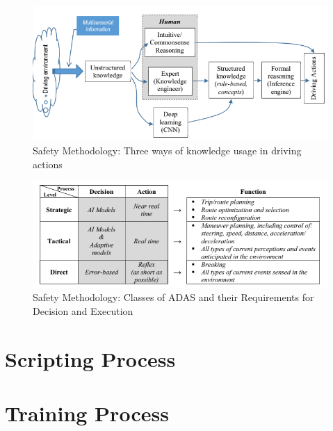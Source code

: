 \documentclass[12pt]{report} %
\begin{document}
		\begin{figure}[ht]
			\centering
			\includegraphics[width=.60\columnwidth]{Figures/literature_review/proposal/SystemFunctionality-2.png}
			\caption{Safety Methodology: Three ways of knowledge usage in driving actions~\cite{ionita_autonomous_2017}}
			\label{fig:avmOperationalMethodology-SF2}
		\end{figure}

		\begin{figure}[ht]
			\centering
			\includegraphics[width=.60\columnwidth]{Figures/literature_review/proposal/SystemFunctionality-3.png}
			\caption{Safety Methodology: Classes of ADAS and their Requirements for Decision and Execution~\cite{ionita_autonomous_2017}}
			\label{fig:avmOperationalMethodology-SF3}
		\end{figure}



\chapter{Scripting Process}
\label{chap:scriptingProcess}
	\section{}

\chapter{Training Process}
\label{chap:trainingProcess}
\end{document}
